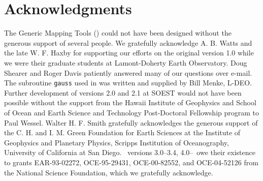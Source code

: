 %
%


\chapter*{Acknowledgments}

The Generic Mapping Tools (\GMT) could not have been designed without
the generous support of several people.  We gratefully acknowledge
A. B. Watts and the late W. F. Haxby for supporting our efforts on the original
version 1.0 while we were their graduate students at Lamont-Doherty
Earth Observatory.  Doug Shearer and Roger Davis patiently answered
many of our questions over e-mail.  The subroutine \texttt{gauss} used in
 was written and supplied by Bill Menke, L-DEO.
Further development of versions 2.0 and 2.1 at SOEST would not have
been possible without the support from the Hawaii Institute of
Geophysics and School of Ocean and Earth Science and Technology
Post-Doctoral Fellowship program to Paul Wessel.  Walter H. F. Smith
gratefully acknowledges the generous support of the C. H. and I. M.
Green Foundation for Earth Sciences at the Institute of Geophysics
and Planetary Physics, Scripps Institution of Oceanography, University
of California at San Diego.
\GMT\ versions 3.0--3.4, 4.0--\GMTDOCVERSION\ owe their existence to grants
EAR-93-02272, OCE-95-29431, OCE-00-82552, and OCE-04-52126
from the National Science Foundation, which we gratefully acknowledge.

